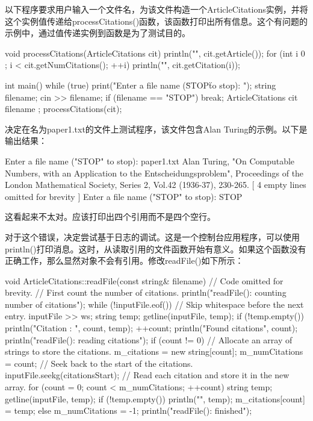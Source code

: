 
以下程序要求用户输入一个文件名，为该文件构造一个ArticleCitations实例，并将这个实例值传递给processCitations()函数，该函数打印出所有信息。这个有问题的示例中，通过值传递实例到函数是为了测试目的。

\begin{cpp}
void processCitations(ArticleCitations cit)
{
    println("{}", cit.getArticle());
    for (int i { 0 }; i < cit.getNumCitations(); ++i) {
        println("{}", cit.getCitation(i));
    }
}

int main()
{
    while (true) {
        print("Enter a file name (\"STOP\" to stop): ");
        string filename;
        cin >> filename;
        if (filename == "STOP") { break; }
        ArticleCitations cit { filename };
        processCitations(cit);
    }
}
\end{cpp}

决定在名为paper1.txt的文件上测试程序，该文件包含Alan Turing的示例。以下是输出结果：

\begin{shell}
Enter a file name ("STOP" to stop): paper1.txt
Alan Turing, "On Computable Numbers, with an Application to the
Entscheidungsproblem", Proceedings of the London Mathematical Society, Series 2,
Vol.42 (1936-37), 230-265.
[ 4 empty lines omitted for brevity ]
Enter a file name ("STOP" to stop): STOP
\end{shell}

这看起来不太对。应该打印出四个引用而不是四个空行。


对于这个错误，决定尝试基于日志的调试。这是一个控制台应用程序，可以使用println()打印消息。这时，从读取引用的文件函数开始有意义。如果这个函数没有正确工作，那么显然对象不会有引用。修改readFile()如下所示：

\begin{cpp}
void ArticleCitations::readFile(const string& filename)
{
    // Code omitted for brevity.
    // First count the number of citations.
    println("readFile(): counting number of citations");
    while (!inputFile.eof()) {
        // Skip whitespace before the next entry.
        inputFile >> ws;
        string temp;
        getline(inputFile, temp);
        if (!temp.empty()) {
            println("Citation {}: {}", count, temp);
            ++count;
        }
        }
        println("Found {} citations", count);
        println("readFile(): reading citations");
        if (count != 0) {
        // Allocate an array of strings to store the citations.
        m_citations = new string[count];
        m_numCitations = count;
        // Seek back to the start of the citations.
        inputFile.seekg(citationsStart);
        // Read each citation and store it in the new array.
        for (count = 0; count < m_numCitations; ++count) {
            string temp;
            getline(inputFile, temp);
            if (!temp.empty()) {
                println("{}", temp);
                m_citations[count] = temp;
            }
        }
    } else {
        m_numCitations = -1;
    }
    println("readFile(): finished");
}
\end{cpp}

